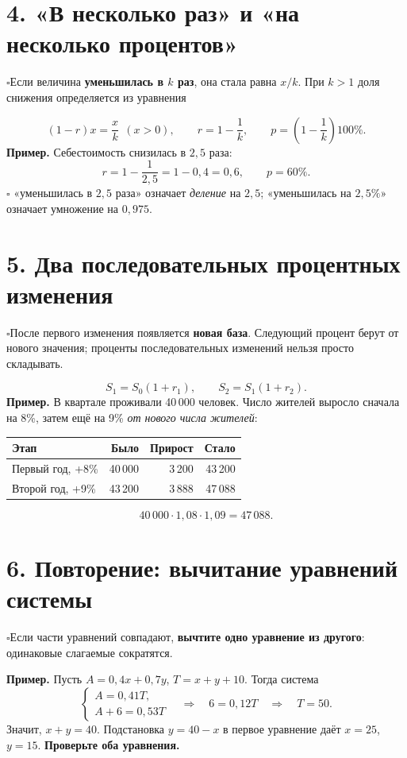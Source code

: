 \documentclass[a4paper,12pt]{article}
\newcommand{\checkitem}[1]{\noindent\(\square\)\enspace #1\par}
\newcommand{\keyterm}[1]{{\color{darkaccent}\textbf{#1}}}
\newcommand{\smallrule}{\par\vspace{.15em}{\color{lightline}\rule{\linewidth}{.35pt}}\vspace{.15em}}
\begin{document}
\smallrule
\section*{4. «В несколько раз» и «на несколько процентов»}
\checkitem{Если величина \keyterm{уменьшилась в \(k\) раз}, она стала равна \(x/k\). При \(k>1\) доля снижения определяется из уравнения}
\[
(1-r)x=\frac{x}{k}\ \ (x>0),\qquad
\boxed{r=1-\frac{1}{k},\qquad p=\left(1-\frac{1}{k}\right)100\%.}
\]
\textbf{Пример.} Себестоимость снизилась в \(2{,}5\) раза:
\[
 r=1-\frac{1}{2{,}5}=1-0{,}4=0{,}6,
\qquad \boxed{p=60\%.}
\]
\checkitem{\keyterm{Важно:} «уменьшилась в \(2{,}5\) раза» означает \emph{деление} на \(2{,}5\); «уменьшилась на \(2{,}5\%\)» означает умножение на \(0{,}975\).}

\section*{5. Два последовательных процентных изменения}
\checkitem{После первого изменения появляется \keyterm{новая база}. Следующий процент берут от нового значения; проценты последовательных изменений нельзя просто складывать.}
\[
\boxed{S_1=S_0(1+r_1),\qquad S_2=S_1(1+r_2).}
\]
\textbf{Пример.} В квартале проживали 40\,000 человек. Число жителей выросло сначала на 8\%, затем ещё на 9\% \emph{от нового числа жителей}:
\begin{center}
\renewcommand{\arraystretch}{1.2}
\begin{tabularx}{\linewidth}{@{}Xrrr@{}}
\toprule
\textbf{Этап} & \textbf{Было} & \textbf{Прирост} & \textbf{Стало}\\
\midrule
Первый год, +8\% & 40\,000 & 3\,200 & 43\,200\\
Второй год, +9\% & 43\,200 & 3\,888 & 47\,088\\
\bottomrule
\end{tabularx}
\end{center}
\[
\boxed{40\,000\cdot1{,}08\cdot1{,}09=47\,088.}
\]

\section*{6. Повторение: вычитание уравнений системы}
\checkitem{Если части уравнений совпадают, \keyterm{вычтите одно уравнение из другого}: одинаковые слагаемые сократятся.}
\textbf{Пример.} Пусть \(A=0{,}4x+0{,}7y\), \(T=x+y+10\). Тогда система
\[
\begin{cases}A=0{,}41T,\\A+6=0{,}53T\end{cases}
\quad\Longrightarrow\quad 6=0{,}12T\quad\Longrightarrow\quad T=50.
\]
Значит, \(x+y=40\). Подстановка \(y=40-x\) в первое уравнение даёт \(x=25\), \(y=15\). \keyterm{Проверьте оба уравнения.}
\end{document}
